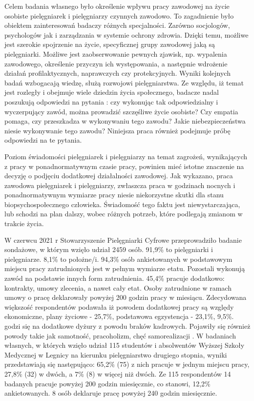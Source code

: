 \documentclass[a4paper,12pt,twoside,openright]{mwrep}
\begin{document}
Celem badania własnego było określenie wpływu pracy zawodowej na życie osobiste pielęgniarek i pielęgniarzy czynnych zawodowo. To zagadnienie było obiektem zainteresowań badaczy różnych specjalności. Zarówno socjologów, psychologów jak i zarządzania w systemie ochrony zdrowia.  Dzięki temu, możliwe jest szerokie spojrzenie na życie, specyficznej grupy zawodowej jaką są pielęgniarki. Możliwe jest zaobserwowanie pewnych zjawisk, np. wypalenia zawodowego, określenie przyczyn ich występowania, a następnie wdrożenie działań profilaktycznych, naprawczych czy protekcyjnych. Wyniki kolejnych badań wzbogacają wiedzę, służą rozwojowi pielęgniarstwa. Ze względu, iż temat jest rozległy i obejmuje wiele dziedzin życia społecznego, badacze nadal poszukują odpowiedzi na pytania : czy wykonując tak odpowiedzialny i wyczerpujący zawód, można prowadzić szczęśliwe życie osobiste? Czy empatia pomaga, czy przeszkadza w wykonywaniu tego zawodu? Jakie niebezpieczeństwa niesie wykonywanie tego zawodu? Niniejsza praca również podejmuje próbę odpowiedzi na te pytania.

Poziom świadomości pielęgniarek i pielęgniarzy na temat zagrożeń, wynikających z pracy w ponadnormatywnym czasie pracy, powinien mieć istotne znaczenie na decyzję o podjęciu dodatkowej działalności zawodowej. 
Jak wykazano, praca zawodowa pielęgniarek i pielęgniarzy, zwłaszcza praca w godzinach nocnych i ponadnormatywnym wymiarze pracy niesie niekorzystne skutki dla stanu biopsychospołecznego człowieka. Świadomość tego faktu jest niewystarczająca, lub schodzi na plan dalszy, wobec różnych potrzeb, które podlegają zmianom w trakcie życia.

W czerwcu 2021 r Stowarzyszenie Pielęgniarki Cyfrowe przeprowadziło badanie sondażowe, w którym wzięło udział 2459 osób. 91,9\% to pielęgniarki i pielęgniarze. 8,1\% to położne/i.  94,3\%   osób ankietowanych w podstawowym miejscu pracy zatrudnionych jest w pełnym wymiarze etatu. Pozostali wykonują zawód na podstawie innych form zatrudnienia. 45,4\%  pracuje dodatkowo: kontrakty, umowy zlecenia, a nawet cały etat. Osoby zatrudnione w ramach umowy o pracę deklarowały powyżej 200 godzin pracy w miesiącu. Zdecydowana większość respondentów podawała iż powodem dodatkowej pracy są względy ekonomiczne, plany życiowe - 25,7\%,  podstawowa egzystencja -  23,1\%, 9,5\%. godzi się na dodatkowe dyżury z powodu braków kadrowych. Pojawiły się również powody takie jak samotność, pracoholizm, chęć samorealizacji \cite{cyfrowe}. W badaniach własnych, w których wzięło udział 115 studentów i absolwentów Wyższej Szkoły Medycznej  w Legnicy na kierunku pielęgniarstwo drugiego stopnia, wyniki  przedstawiają się następująco: 65,2\% (75)  z nich pracuje w jednym miejscu pracy, 27,8\%  (32) w dwóch, a 7\%  (8) w więcej niż dwóch.  Ze 115 respondentów  14 badanych  pracuje powyżej 200 godzin miesięcznie, co stanowi, 12,2\% ankietowanych. 8 osób deklaruje pracę powyżej  240 godzin miesięcznie.
\end{document}

